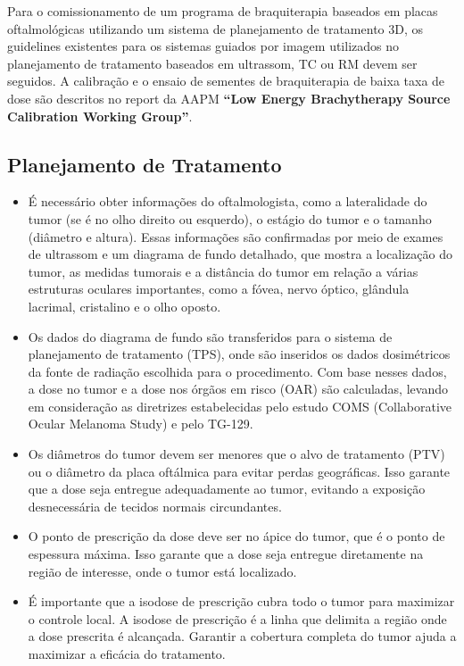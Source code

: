 \documentclass[11pt,a4paper]{article}
\begin{document}
    Para o comissionamento de um programa de braquiterapia baseados em placas oftalmológicas utilizando um sistema de planejamento de tratamento 3D, os guidelines existentes para os sistemas guiados por imagem utilizados no planejamento de tratamento baseados em ultrassom, TC ou RM devem ser seguidos. A calibração e o ensaio de sementes de braquiterapia de baixa taxa de dose são descritos no report da AAPM \textbf{``Low Energy Brachytherapy Source Calibration Working Group''}.

\subsection*{Planejamento de Tratamento} 


\begin{itemize}
    \item É necessário obter informações do oftalmologista, como a lateralidade do tumor (se é no olho direito ou esquerdo), o estágio do tumor e o tamanho (diâmetro e altura). Essas informações são confirmadas por meio de exames de ultrassom e um diagrama de fundo detalhado, que mostra a localização do tumor, as medidas tumorais e a distância do tumor em relação a várias estruturas oculares importantes, como a fóvea, nervo óptico, glândula lacrimal, cristalino e o olho oposto.
    
    \item Os dados do diagrama de fundo são transferidos para o sistema de planejamento de tratamento (TPS), onde são inseridos os dados dosimétricos da fonte de radiação escolhida para o procedimento. Com base nesses dados, a dose no tumor e a dose nos órgãos em risco (OAR) são calculadas, levando em consideração as diretrizes estabelecidas pelo estudo COMS (Collaborative Ocular Melanoma Study) e pelo TG-129.
    
    \item Os diâmetros do tumor devem ser menores que o alvo de tratamento (PTV) ou o diâmetro da placa oftálmica para evitar perdas geográficas. Isso garante que a dose seja entregue adequadamente ao tumor, evitando a exposição desnecessária de tecidos normais circundantes.
    
    \item O ponto de prescrição da dose deve ser no ápice do tumor, que é o ponto de espessura máxima. Isso garante que a dose seja entregue diretamente na região de interesse, onde o tumor está localizado.
    
    \item É importante que a isodose de prescrição cubra todo o tumor para maximizar o controle local. A isodose de prescrição é a linha que delimita a região onde a dose prescrita é alcançada. Garantir a cobertura completa do tumor ajuda a maximizar a eficácia do tratamento.
    

\end{itemize}
\end{document}
